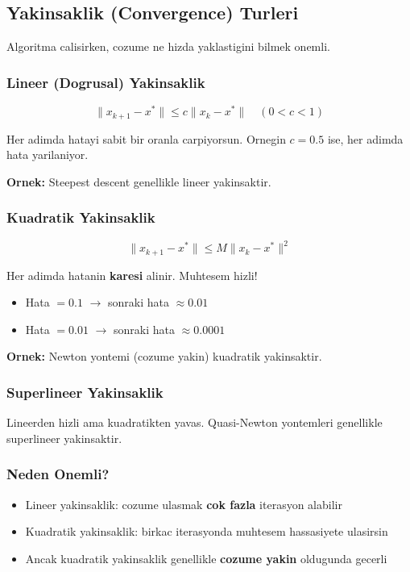 \documentclass[12pt,a4paper]{article}
\theoremstyle{definition}
\theoremstyle{remark}
\begin{document}
\subsection{Yakinsaklik (Convergence) Turleri}

Algoritma calisirken, cozume ne hizda yaklastigini bilmek onemli.

\subsubsection{Lineer (Dogrusal) Yakinsaklik}

\[
\|x_{k+1} - x^*\| \leq c \|x_k - x^*\| \quad (0 < c < 1)
\]

Her adimda hatayi sabit bir oranla carpiyorsun. Ornegin $c = 0.5$ ise, her adimda hata yarilaniyor.

\textbf{Ornek:} Steepest descent genellikle lineer yakinsaktir.

\subsubsection{Kuadratik Yakinsaklik}

\[
\|x_{k+1} - x^*\| \leq M \|x_k - x^*\|^2
\]

Her adimda hatanin \textbf{karesi} alinir. Muhtesem hizli!

\begin{itemize}[leftmargin=*, itemsep=0.2em]
\item Hata $= 0.1$ $\rightarrow$ sonraki hata $\approx 0.01$
\item Hata $= 0.01$ $\rightarrow$ sonraki hata $\approx 0.0001$
\end{itemize}

\textbf{Ornek:} Newton yontemi (cozume yakin) kuadratik yakinsaktir.

\subsubsection{Superlineer Yakinsaklik}

Lineerden hizli ama kuadratikten yavas. Quasi-Newton yontemleri genellikle superlineer yakinsaktir.

\subsubsection{Neden Onemli?}

\begin{itemize}[leftmargin=*, itemsep=0.2em]
\item Lineer yakinsaklik: cozume ulasmak \textbf{cok fazla} iterasyon alabilir
\item Kuadratik yakinsaklik: birkac iterasyonda muhtesem hassasiyete ulasirsin
\item Ancak kuadratik yakinsaklik genellikle \textbf{cozume yakin} oldugunda gecerli
\end{itemize}
\end{document}
